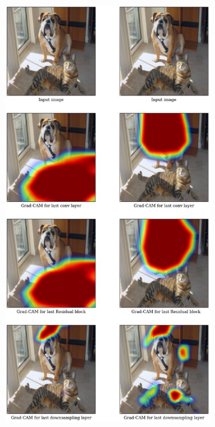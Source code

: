 
\begin{figure}
     \centering
        \begin{subfigure}[t]{0.49\textwidth}
        \begin{center}
     \includegraphics[width=\linewidth]{figures/resnet_200_analysis.jpg}

\end{center}
\end{subfigure}
\end{figure}
